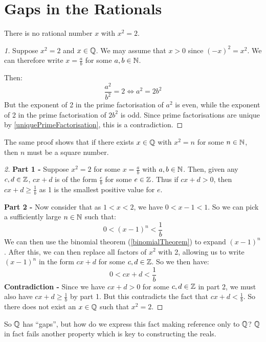 \documentclass[../main.tex]{subfiles}
\begin{document}
\section{Gaps in the Rationals}
\begin{proposition}
  There is no rational number $x$ with $x^2 = 2$.
\end{proposition}
\begin{proof}[1]
  Suppose $x^2 = 2$ and $x \in \mathbb{Q}$.
  We may assume that $x > 0$ since $(-x)^2 = x^2$.
  We can therefore write $x = \frac{a}{b}$ for some $a, b \in \mathbb{N}$.

  Then:
  \[
    \frac{a^2}{b^2} = 2 \iff a^2 = 2b^2
  \]
  But the exponent of 2 in the prime factorisation of $a^2$ is even, while the exponent of 2 in the prime factorisation of $2b^2$ is odd.
  Since prime factorisations are unique by \cref{uniquePrimeFactorisation}, this is a contradiction.
\end{proof}
\begin{remark}[Note]
  The same proof shows that if there exists $x \in \mathbb{Q}$ with $x^2 = n$ for some $n \in \mathbb{N}$, then $n$ must be a square number.
\end{remark}
\begin{proof}[2]\par
  \textbf{Part 1 -}
  Suppose $x^2 = 2$ for some $x = \frac{a}{b}$ with $a, b \in \mathbb{N}$.
  Then, given any $c, d \in \mathbb{Z}$, $cx + d$ is of the form $\frac{e}{b}$ for some $e \in \mathbb{Z}$.
  Thus if $cx + d > 0$, then $cx + d \geq \frac{1}{b}$ as 1 is the smallest positive value for $e$.

  \textbf{Part 2 -}
  Now consider that as $1 < x < 2$, we have $0 < x - 1 < 1$.
  So we can pick a sufficiently large $n \in \mathbb{N}$ such that:
  \[
    0 < (x - 1)^{n} < \frac{1}{b}
  \]
  We can then use the binomial theorem (\cref{binomialTheorem}) to expand $(x - 1)^{n}$.
  After this, we can then replace all factors of $x^2$ with 2, allowing us to write $(x - 1)^{n}$ in the form $cx + d$ for some $c, d \in \mathbb{Z}$.
  So we then have:
  \[
    0 < cx + d < \frac{1}{b}
  \]
  \textbf{Contradiction -}
  Since we have $cx + d > 0$ for some $c, d \in \mathbb{Z}$ in part 2, we must also have $cx + d \geq \frac{1}{b}$ by part 1.
  But this contradicts the fact that $cx + d < \frac{1}{b}$.
  So there does not exist an $x \in \mathbb{Q}$ such that $x^2 = 2$.
\end{proof}
So $\mathbb{Q}$ has ``gaps'', but how do we express this fact making reference only to $\mathbb{Q}$?
$\mathbb{Q}$ in fact fails another property which is key to constructing the reals.
\end{document}
